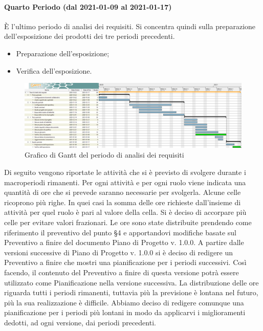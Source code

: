 \paragraph{Quarto Periodo (dal 2021-01-09 al 2021-01-17)}
È l'ultimo periodo di analisi dei requisiti. Si concentra quindi sulla preparazione dell'esposizione dei prodotti dei tre periodi precedenti.
\begin{itemize}
	\item Preparazione dell'esposizione;
	\item Verifica dell'esposizione.
\end{itemize}


\begin{landscape}
	\begin{figure}[H]
		\centering
		\includegraphics[width=\linewidth]{res/images/ganttFase1.png}
		\caption{ Grafico di Gantt del periodo di analisi dei requisiti}
		\label{fig:Gantt Analisi dei requisiti}
	\end{figure}
\end{landscape}



\noindent Di seguito vengono riportate le attività che si è previsto di svolgere durante i macroperiodi rimanenti. Per ogni attività e per ogni ruolo viene indicata una quantità di ore che si prevede saranno necessarie per svolgerla. Alcune celle ricoprono più righe. In quei casi la somma delle ore richieste dall'insieme di attività per quel ruolo è pari al valore della cella. Si è deciso di accorpare più celle per evitare valori frazionari. \newline
\indent Le ore sono state distribuite prendendo come riferimento il preventivo del punto §4 e apportandovi modifiche basate sul Preventivo a finire del documento Piano di Progetto v. 1.0.0. A partire dalle versioni successive di Piano di Progetto v. 1.0.0 si è deciso di redigere un Preventivo a finire che mostri una pianificazione per i periodi successivi. Così facendo, il contenuto del Preventivo a finire di questa versione potrà essere utilizzato come Pianificazione nella versione successiva. \newline
\indent La distribuzione delle ore riguarda tutti i periodi rimanenti, tuttavia più la previsione è lontana nel futuro, più la sua realizzazione è difficile. Abbiamo deciso di redigere comunque una pianificazione per i periodi più lontani in modo da applicarvi i miglioramenti dedotti, ad ogni versione, dai periodi precedenti. \newline

